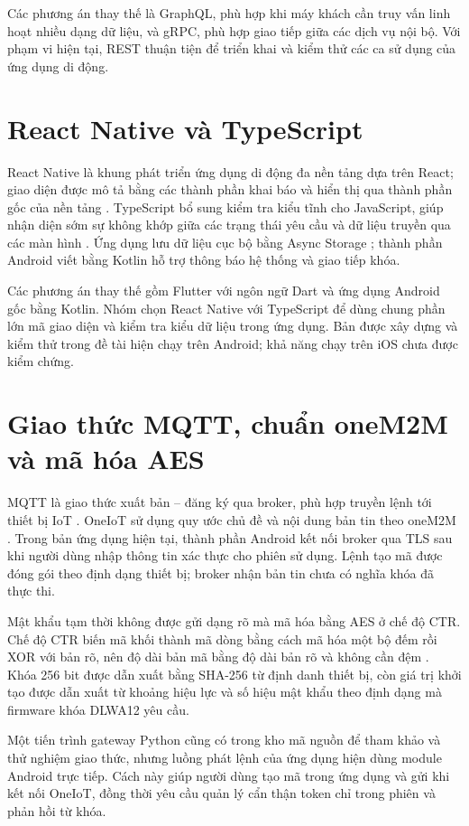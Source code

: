 \documentclass[../DoAn.tex]{subfiles}
\begin{document}
Các phương án thay thế là GraphQL, phù hợp khi máy khách cần truy vấn linh hoạt nhiều dạng dữ liệu, và gRPC, phù hợp giao tiếp giữa các dịch vụ nội bộ. Với phạm vi hiện tại, REST thuận tiện để triển khai và kiểm thử các ca sử dụng của ứng dụng di động.

\section{React Native và TypeScript}
\label{section:3.5}
React Native là khung phát triển ứng dụng di động đa nền tảng dựa trên React; giao diện được mô tả bằng các thành phần khai báo và hiển thị qua thành phần gốc của nền tảng \cite{reactnative}. TypeScript bổ sung kiểm tra kiểu tĩnh cho JavaScript, giúp nhận diện sớm sự không khớp giữa các trạng thái yêu cầu và dữ liệu truyền qua các màn hình \cite{typescript}. Ứng dụng lưu dữ liệu cục bộ bằng Async Storage \cite{asyncstorage}; thành phần Android viết bằng Kotlin hỗ trợ thông báo hệ thống và giao tiếp khóa.

Các phương án thay thế gồm Flutter với ngôn ngữ Dart và ứng dụng Android gốc bằng Kotlin. Nhóm chọn React Native với TypeScript để dùng chung phần lớn mã giao diện và kiểm tra kiểu dữ liệu trong ứng dụng. Bản được xây dựng và kiểm thử trong đề tài hiện chạy trên Android; khả năng chạy trên iOS chưa được kiểm chứng.

\section{Giao thức MQTT, chuẩn oneM2M và mã hóa AES}
\label{section:3.6}
MQTT là giao thức xuất bản -- đăng ký qua broker, phù hợp truyền lệnh tới thiết bị IoT \cite{mqtt5}. OneIoT sử dụng quy ước chủ đề và nội dung bản tin theo oneM2M \cite{onem2mmqtt}. Trong bản ứng dụng hiện tại, thành phần Android kết nối broker qua TLS sau khi người dùng nhập thông tin xác thực cho phiên sử dụng. Lệnh tạo mã được đóng gói theo định dạng thiết bị; broker nhận bản tin chưa có nghĩa khóa đã thực thi.

Mật khẩu tạm thời không được gửi dạng rõ mà mã hóa bằng AES ở chế độ CTR. Chế độ CTR biến mã khối thành mã dòng bằng cách mã hóa một bộ đếm rồi XOR với bản rõ, nên độ dài bản mã bằng độ dài bản rõ và không cần đệm \cite{dworkin2001sp80038a}. Khóa 256 bit được dẫn xuất bằng SHA-256 từ định danh thiết bị, còn giá trị khởi tạo được dẫn xuất từ khoảng hiệu lực và số hiệu mật khẩu theo định dạng mà firmware khóa DLWA12 yêu cầu.

Một tiến trình gateway Python cũng có trong kho mã nguồn để tham khảo và thử nghiệm giao thức, nhưng luồng phát lệnh của ứng dụng hiện dùng module Android trực tiếp. Cách này giúp người dùng tạo mã trong ứng dụng và gửi khi kết nối OneIoT, đồng thời yêu cầu quản lý cẩn thận token chỉ trong phiên và phản hồi từ khóa.
\end{document}
